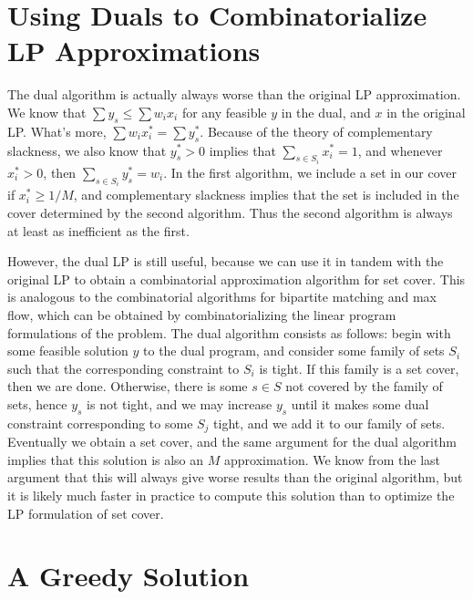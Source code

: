 \section{Using Duals to Combinatorialize LP Approximations}

The dual algorithm is actually always worse than the original LP approximation. We know that $\sum y_s \leq \sum w_i x_i$ for any feasible $y$ in the dual, and $x$ in the original LP. What's more, $\sum w_i x_i^* = \sum y_s^*$. Because of the theory of complementary slackness, we also know that $y_s^* > 0$ implies that $\sum_{s \in S_i} x_i^* = 1$, and whenever $x_i^* > 0$, then $\sum_{s \in S_i} y_s^* = w_i$. In the first algorithm, we include a set in our cover if $x_i^* \geq 1/M$, and complementary slackness implies that the set is included in the cover determined by the second algorithm. Thus the second algorithm is always at least as inefficient as the first.

However, the dual LP is still useful, because we can use it in tandem with the original LP to obtain a combinatorial approximation algorithm for set cover. This is analogous to the combinatorial algorithms for bipartite matching and max flow, which can be obtained by combinatorializing the linear program formulations of the problem. The dual algorithm consists as follows: begin with some feasible solution $y$ to the dual program, and consider some family of sets $S_i$ such that the corresponding constraint to $S_i$ is tight. If this family is a set cover, then we are done. Otherwise, there is some $s \in S$ not covered by the family of sets, hence $y_s$ is not tight, and we may increase $y_s$ until it makes some dual constraint corresponding to some $S_j$ tight, and we add it to our family of sets. Eventually we obtain a set cover, and the same argument for the dual algorithm implies that this solution is also an $M$ approximation. We know from the last argument that this will always give worse results than the original algorithm, but it is likely much faster in practice to compute this solution than to optimize the LP formulation of set cover.

\section{A Greedy Solution}

